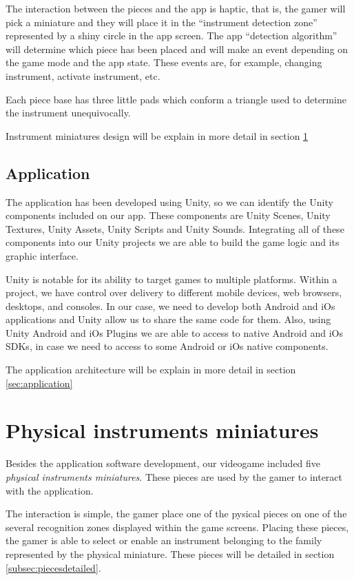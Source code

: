 The interaction between the pieces and the app is haptic, that is, the gamer will pick a miniature and they will place it in the “instrument detection zone” represented by a shiny circle in the app screen. The app “detection algorithm” will determine which piece has been placed and will make an event depending on the game mode and the app state. These events are, for example, changing instrument, activate instrument, etc.

Each piece base has three little pads which conform a triangle used to determine the instrument unequivocally.

Instrument miniatures design will be explain in more detail in section \ref{sec:instrumentminuatures}

\subsection{Application}
The application has been developed using Unity, so we can identify the Unity components included on our app. These components are Unity Scenes, Unity Textures, Unity Assets, Unity Scripts and Unity Sounds. Integrating all of these components into our Unity projects we are able to build the game logic and its graphic interface.

Unity is notable for its ability to target games to multiple platforms. Within a project, we have control over delivery to different mobile devices, web browsers, desktops, and consoles. In our case, we need to develop both Android and iOs applications and Unity allow us to share the same code for them. Also, using Unity Android and iOs Plugins we are able to access to native Android and iOs SDKs, in case we need to access to some Android or iOs native components.

The application architecture will be explain in more detail in section \ref{sec:application}

\FloatBarrier

\section{Physical instruments miniatures}
\label{sec:instrumentminuatures}
Besides the application software development, our videogame included five \textit{physical instruments miniatures}. These pieces are used by the gamer to interact with the application.

The interaction is simple, the gamer place one of the pysical pieces on one of the several recognition zones displayed within the game screens. Placing these pieces, the gamer is able to select or enable an instrument belonging to the family represented by the physical miniature. These pieces will be detailed in section \ref{subsec:piecesdetailed}.

